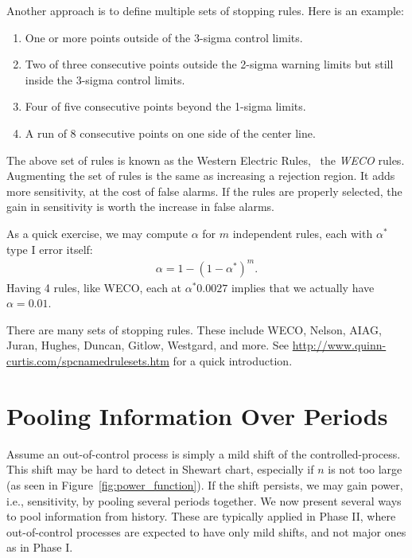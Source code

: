 Another approach is to define multiple sets of stopping rules.
Here is an example:
\begin{enumerate}
\item One or more points outside of the 3-sigma control limits.
\item Two of three consecutive points outside the 2-sigma warning limits but still inside the 3-sigma control limits.
\item Four of five consecutive points beyond the 1-sigma limits.
\item A run of 8 consecutive points on one side of the center line.
\end{enumerate}
The above set of rules is known as the Western Electric Rules, \aka\, the \emph{WECO} rules.
Augmenting the set of rules is the same as increasing a rejection region. It adds more sensitivity, at the cost of false alarms. If the rules are properly selected, the gain in sensitivity is worth the increase in false alarms.

As a quick exercise, we may compute $\alpha$  for $m$ independent rules, each with $\alpha^*$ type I error itself:
\begin{align}
\label{eq:multiplicity_in_spc}
	\alpha=1-(1-\alpha^*)^m.
\end{align}
Having 4 rules, like WECO, each at $\alpha^*0.0027$ implies that we actually have $\alpha=0.01$.

\begin{extra}
There are many sets of stopping rules. 
These include WECO, Nelson, AIAG, Juran, Hughes, Duncan, Gitlow, Westgard, and more. 
See \url{http://www.quinn-curtis.com/spcnamedrulesets.htm} for a quick introduction.
\end{extra}






\section{Pooling Information Over Periods}
\label{sec:running_windows}

Assume an out-of-control process is simply a mild shift of the controlled-process.
This shift may be hard to detect in Shewart chart, especially if $n$ is not too large (as seen in Figure~\ref{fig:power_function}).  
If the shift persists, we may gain power, i.e., sensitivity, by pooling several periods together. 
We now present several ways to pool information from history. These are typically applied in Phase II, where out-of-control processes are expected to have only mild shifts, and not major ones as in Phase I. 

